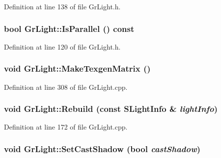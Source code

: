 Definition at line 138 of file GrLight.h.\hypertarget{class_gr_light_e1b04eb006abc19edf83dcdb1e364110}{
\subsubsection[{IsParallel}]{\setlength{\rightskip}{0pt plus 5cm}bool GrLight::IsParallel () const}}
\label{class_gr_light_e1b04eb006abc19edf83dcdb1e364110}




Definition at line 120 of file GrLight.h.\hypertarget{class_gr_light_935b67174f2ad695b5f185f8abe7da7a}{
\subsubsection[{MakeTexgenMatrix}]{\setlength{\rightskip}{0pt plus 5cm}void GrLight::MakeTexgenMatrix ()}}
\label{class_gr_light_935b67174f2ad695b5f185f8abe7da7a}




Definition at line 308 of file GrLight.cpp.\hypertarget{class_gr_light_44ae46cddc4b62539e31d8a861582727}{
\subsubsection[{Rebuild}]{\setlength{\rightskip}{0pt plus 5cm}void GrLight::Rebuild (const {\bf SLightInfo} \& {\em lightInfo})}}
\label{class_gr_light_44ae46cddc4b62539e31d8a861582727}




Definition at line 172 of file GrLight.cpp.\hypertarget{class_gr_light_7c2845100b12ebc9c1c37ccc403ea1d8}{
\subsubsection[{SetCastShadow}]{\setlength{\rightskip}{0pt plus 5cm}void GrLight::SetCastShadow (bool {\em castShadow})}}
\label{class_gr_light_7c2845100b12ebc9c1c37ccc403ea1d8}




